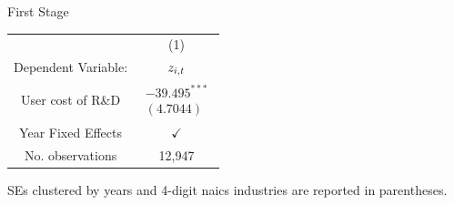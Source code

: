 \documentclass[english,aspectratio=169,handout]{beamer}
\theoremstyle{plain}
\begin{document}
\begin{frame}{First Stage \hyperlink{regression}{}}
  \begin{center}
    {\footnotesize\label{first_stage}}%
    \begin{tabular}{cc}
      \hline
      \hline              & (1)\tabularnewline
      Dependent Variable: & $\text{\ensuremath{z_{i,t}}}$\tabularnewline
      \hline
      User cost of R\&D   & $\begin{array}{c}
                                 -39.495^{***} \\
                                 (4.7044)
                               \end{array}$\tabularnewline
      \hline
      Year Fixed Effects  & $\checkmark$\tabularnewline
      No. observations    & 12,947\tabularnewline
      \hline
    \end{tabular}\medskip{}
    \par\end{center}

  {\footnotesize SEs clustered by years and 4-digit naics industries
  are reported in parentheses.}{\footnotesize\par}
\end{frame}
\end{document}
